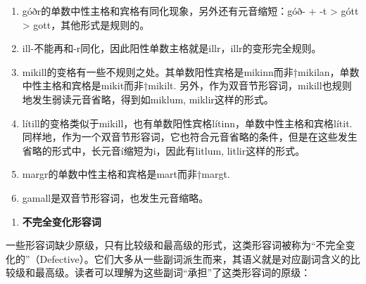 \begin{enumerate}
\def\labelenumi{\alph{enumi})}
\item
  góðr的单数中性主格和宾格有同化现象，另外还有元音缩短：góð- + -t
  \textgreater{} gótt \textgreater{} gott，其他形式是规则的。
\item
  ill-不能再和-r同化，因此阳性单数主格就是illr，illr的变形完全规则。
\item
  mikill的变格有一些不规则之处。其单数阳性宾格是mikinn而非†mikilan，单数中性主格和宾格是mikit而非†mikilt.
  另外，作为双音节形容词，mikill也规则地发生弱读元音省略，得到如miklum,
  miklir这样的形式。
\item
  lítill的变格类似于mikill，也有单数阳性宾格lítinn，单数中性主格和宾格lítit.
  同样地，作为一个双音节形容词，它也符合元音省略的条件，但是在这些发生省略的形式中，长元音í缩短为i，因此有litlum,
  litlir这样的形式。
\item
  margr的单数中性主格和宾格是mart而非†margt.
\item
  gamall是双音节形容词，也发生元音缩略。
\end{enumerate}

\begin{enumerate}
\def\labelenumi{\arabic{enumi})}
\setcounter{enumi}{2}
\item
  \textbf{不完全变化形容词}
\end{enumerate}

一些形容词缺少原级，只有比较级和最高级的形式，这类形容词被称为``不完全变化的''（Defective）。它们大多从一些副词派生而来，其语义就是对应副词含义的比较级和最高级。读者可以理解为这些副词``承担''了这类形容词的原级：

